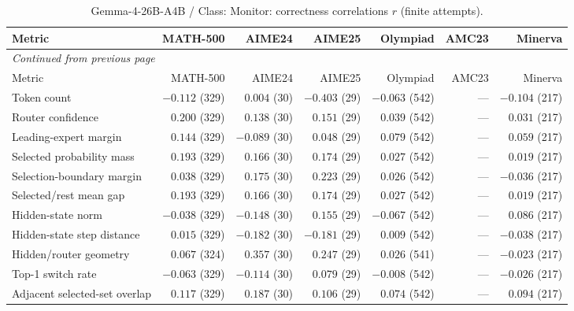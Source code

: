 \begingroup\scriptsize\setlength{\tabcolsep}{4pt}
\begin{longtable}{@{}lrrrrrr@{}}
\caption{Gemma-4-26B-A4B / Class: Monitor: correctness correlations $r$ (finite attempts).}\label{tab:multi-gemma-class-Monitor}\\
\toprule
Metric & MATH-500 & AIME24 & AIME25 & Olympiad & AMC23 & Minerva \\
\midrule\endfirsthead
\multicolumn{7}{l}{\textit{Continued from previous page}}\\
\toprule
Metric & MATH-500 & AIME24 & AIME25 & Olympiad & AMC23 & Minerva \\
\midrule\endhead
\bottomrule\endfoot
Token count & $-0.112$ (329) & $0.004$ (30) & $-0.403$ (29) & $-0.063$ (542) & --- & $-0.104$ (217) \\
Router confidence & $0.200$ (329) & $0.138$ (30) & $0.151$ (29) & $0.039$ (542) & --- & $0.031$ (217) \\
Leading-expert margin & $0.144$ (329) & $-0.089$ (30) & $0.048$ (29) & $0.079$ (542) & --- & $0.059$ (217) \\
Selected probability mass & $0.193$ (329) & $0.166$ (30) & $0.174$ (29) & $0.027$ (542) & --- & $0.019$ (217) \\
Selection-boundary margin & $0.038$ (329) & $0.175$ (30) & $0.223$ (29) & $0.026$ (542) & --- & $-0.036$ (217) \\
Selected/rest mean gap & $0.193$ (329) & $0.166$ (30) & $0.174$ (29) & $0.027$ (542) & --- & $0.019$ (217) \\
Hidden-state norm & $-0.038$ (329) & $-0.148$ (30) & $0.155$ (29) & $-0.067$ (542) & --- & $0.086$ (217) \\
Hidden-state step distance & $0.015$ (329) & $-0.182$ (30) & $-0.181$ (29) & $0.009$ (542) & --- & $-0.038$ (217) \\
Hidden/router geometry & $0.067$ (324) & $0.357$ (30) & $0.247$ (29) & $0.026$ (541) & --- & $-0.023$ (217) \\
Top-1 switch rate & $-0.063$ (329) & $-0.114$ (30) & $0.079$ (29) & $-0.008$ (542) & --- & $-0.026$ (217) \\
Adjacent selected-set overlap & $0.117$ (329) & $0.187$ (30) & $0.106$ (29) & $0.074$ (542) & --- & $0.094$ (217) \\
\end{longtable}\endgroup

